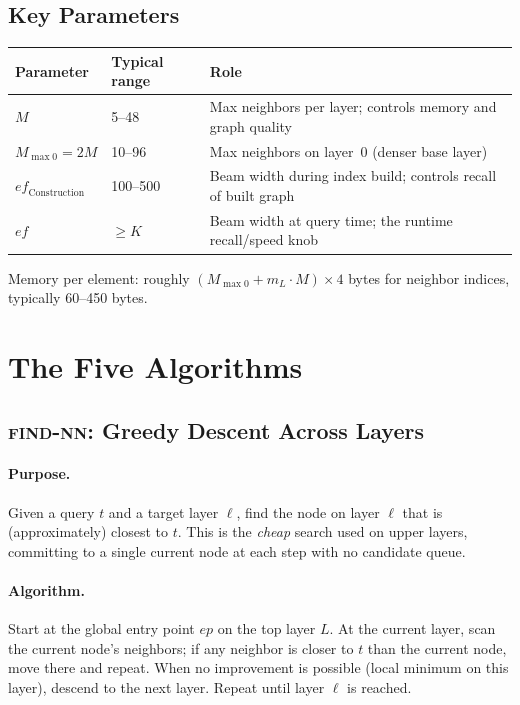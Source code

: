 \documentclass[11pt]{article}
\newcommand{\eps}{\mathit{ep}}
\newcommand{\ef}{\mathit{ef}}
\theoremstyle{definition}
\begin{document}
\subsection{Key Parameters}

\begin{center}
\begin{tabular}{lll}
\toprule
Parameter & Typical range & Role \\
\midrule
$M$ & 5--48 & Max neighbors per layer; controls memory and graph quality \\
$M_{\max 0} = 2M$ & 10--96 & Max neighbors on layer~0 (denser base layer) \\
$\ef_{\mathrm{Construction}}$ & 100--500 & Beam width during index build; controls recall of built graph \\
$\ef$ & $\geq K$ & Beam width at query time; the runtime recall/speed knob \\
\bottomrule
\end{tabular}
\end{center}

Memory per element: roughly $(M_{\max 0} + m_L \cdot M) \times 4$ bytes for neighbor indices, typically 60--450 bytes.

\section{The Five Algorithms}
\label{sec:algorithms}

\subsection{\textsc{find-nn}: Greedy Descent Across Layers}
\label{sec:find-nn}

\paragraph{Purpose.} Given a query $t$ and a target layer $\ell$, find the node on layer $\ell$ that is (approximately) closest to $t$. This is the \emph{cheap} search used on upper layers, committing to a single current node at each step with no candidate queue.

\paragraph{Algorithm.} Start at the global entry point $\eps$ on the top layer $L$. At the current layer, scan the current node's neighbors; if any neighbor is closer to $t$ than the current node, move there and repeat. When no improvement is possible (local minimum on this layer), descend to the next layer. Repeat until layer $\ell$ is reached.
\end{document}
